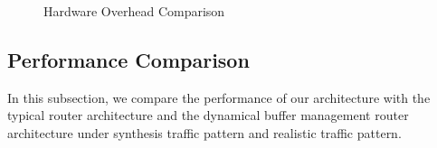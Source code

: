 \documentclass[10pt,conference]{IEEEtran}
\begin{document}
\begin{figure}
  \centering
  \hspace{10pt}
  \caption{Hardware Overhead Comparison}\label{bufcmp}
\end{figure}

\subsection{Performance Comparison}
In this subsection, we compare the performance of our architecture with the typical router architecture \cite{DaTo01} and the dynamical buffer management router architecture \cite{NPKV06}\cite{4555894} under synthesis traffic pattern and realistic traffic pattern.
\end{document}
